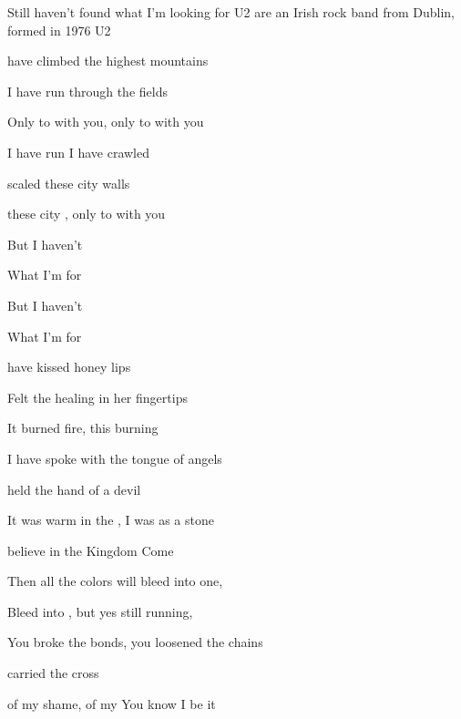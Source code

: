 \begin{SBSong}{Still haven't found what I'm looking for}
  {U2 are an Irish rock band from Dublin, formed in 1976}
  {U2}
  \begin{SBVerse}
     have climbed the highest mountains
    
    I have run through the fields
    
    Only to  with you, only to  with you
    
    I have run I have crawled
    
     scaled these city walls
    
    these city , only to  with you
  \end{SBVerse}
  \begin{SBChorus}
    But I   haven't  
    
    What I'm   for
    
    But I   haven't  
    
    What I'm  for
  \end{SBChorus}
  \begin{SBVerse}
     have kissed honey lips
    
    Felt the healing in her fingertips
    
    It burned  fire, this burning 

    I have spoke with the tongue of angels
    
     held the hand of a devil
    
    It was warm in the , I was  as a stone
  \end{SBVerse}
  \begin{SBVerse}
     believe in the Kingdom Come
    
    Then all the colors will bleed into one,  
    
    Bleed into , but yes  still running, 
    
    You broke the bonds, you loosened the chains

     carried the cross
    
    of my shame, of my  You know I be it
  \end{SBVerse}
\end{SBSong}
